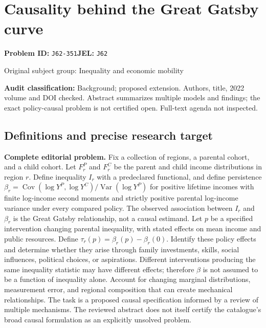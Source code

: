 \documentclass[11pt,a4paper]{article}
\begin{document}
\section*{Causality behind the Great Gatsby curve}
\textbf{Problem ID:} \texttt{J62-351}\quad \textbf{JEL:} \texttt{J62}\par
\label{problem:OP-0368}
{\sffamily\small\color{muted}Original subject group: Inequality and economic mobility\par}
\label{definitions:problem:30007650}
\textbf{Audit classification:} Background; proposed extension. Authors, title, 2022 volume and DOI checked. Abstract summarizes multiple models and findings; the exact policy-causal problem is not certified open. Full-text agenda not inspected.
\subsection*{Definitions and precise research target}
\textbf{Complete editorial problem.} Fix a collection of regions, a parental cohort, and a child cohort. Let \(F^P_r\) and \(F^C_r\) be the parent and child income distributions in region \(r\). Define inequality \(I_r\) with a predeclared functional, and define persistence \(\beta_r=\operatorname{Cov}(\log Y^P,\log Y^C)/\operatorname{Var}(\log Y^P)\) for positive lifetime incomes with finite log-income second moments and strictly positive parental log-income variance under every compared policy. The observed association between \(I_r\) and \(\beta_r\) is the Great Gatsby relationship, not a causal estimand. Let \(p\) be a specified intervention changing parental inequality, with stated effects on mean income and public resources. Define \(\tau_r(p)=\beta_r(p)-\beta_r(0)\). Identify these policy effects and determine whether they arise through family investments, skills, social influences, political choices, or aspirations. Different interventions producing the same inequality statistic may have different effects; therefore \(\beta\) is not assumed to be a function of inequality alone. Account for changing marginal distributions, measurement error, and regional composition that can create mechanical relationships. The task is a proposed causal specification informed by a review of multiple mechanisms. The reviewed abstract does not itself certify the catalogue's broad causal formulation as an explicitly unsolved problem.
\end{document}
